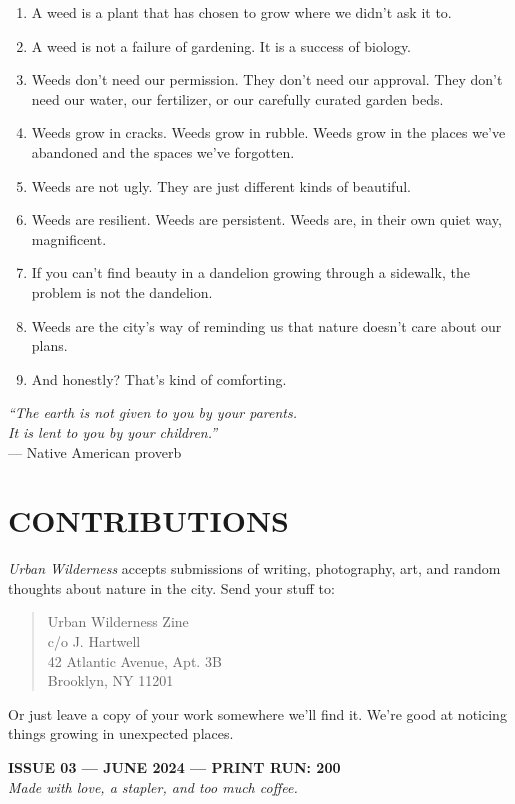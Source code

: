 \documentclass[
    language=english,
    doctype=zine,
    institution=none,
]{../../omnilatex}
\begin{document}
\begin{enumerate}
    \item A weed is a plant that has chosen to grow where we didn't ask it to.
    \item A weed is not a failure of gardening. It is a success of biology.
    \item Weeds don't need our permission. They don't need our approval. They don't need our water, our fertilizer, or our carefully curated garden beds.
    \item Weeds grow in cracks. Weeds grow in rubble. Weeds grow in the places we've abandoned and the spaces we've forgotten.
    \item Weeds are not ugly. They are just different kinds of beautiful.
    \item Weeds are resilient. Weeds are persistent. Weeds are, in their own quiet way, magnificent.
    \item If you can't find beauty in a dandelion growing through a sidewalk, the problem is not the dandelion.
    \item Weeds are the city's way of reminding us that nature doesn't care about our plans.
    \item And honestly? That's kind of comforting.
\end{enumerate}

\vspace{0.5cm}

\begin{center}
\textit{``The earth is not given to you by your parents.\\
It is lent to you by your children.''}\\
--- Native American proverb
\end{center}

\vspace{0.5cm}

\section*{CONTRIBUTIONS}

\textit{Urban Wilderness} accepts submissions of writing, photography, art, and random thoughts about nature in the city. Send your stuff to:

\begin{quote}
Urban Wilderness Zine\\
c/o J. Hartwell\\
42 Atlantic Avenue, Apt. 3B\\
Brooklyn, NY 11201
\end{quote}

Or just leave a copy of your work somewhere we'll find it. We're good at noticing things growing in unexpected places.

\vspace{0.5cm}

\begin{center}
\textbf{ISSUE 03 --- JUNE 2024 --- PRINT RUN: 200}\\
\textit{Made with love, a stapler, and too much coffee.}
\end{center}
\end{document}
